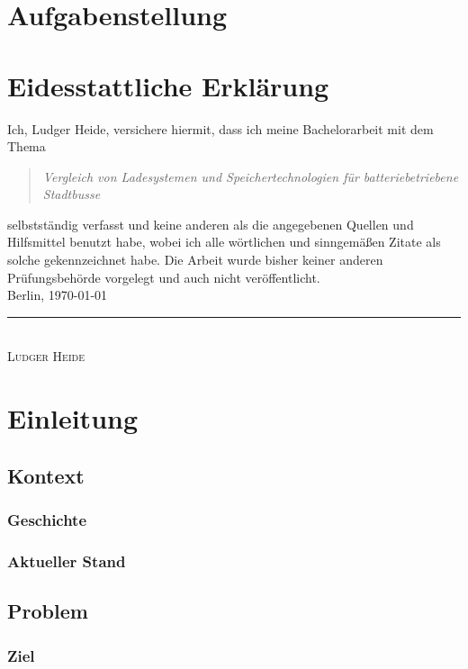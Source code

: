 \documentclass[twoside]{scrreprt}
\begin{document}
\chapter*{Aufgabenstellung}

\chapter*{Eidesstattliche Erklärung}
Ich, Ludger Heide, versichere hiermit, dass ich meine Bachelorarbeit mit dem Thema
\begin{quote}
	\emph{Vergleich von Ladesystemen und Speichertechnologien für batteriebetriebene Stadtbusse}
\end{quote}
selbstständig verfasst und keine anderen als die angegebenen Quellen und Hilfsmittel benutzt habe, wobei ich alle wörtlichen und sinngemäßen Zitate als solche gekennzeichnet habe. Die Arbeit wurde bisher keiner anderen Prüfungsbehörde vorgelegt und auch nicht veröffentlicht.\\[6ex]
Berlin, \today\\
\newline
\rule{4cm}{0.5pt}\\
\textsc{Ludger Heide} 

\tableofcontents

\listoffigures

\listoftables
\newpage

\chapter{Einleitung}
\section{Kontext}
\subsection{Geschichte}
\subsection{Aktueller Stand}
\section{Problem}
\subsection{Ziel} %
\end{document}
